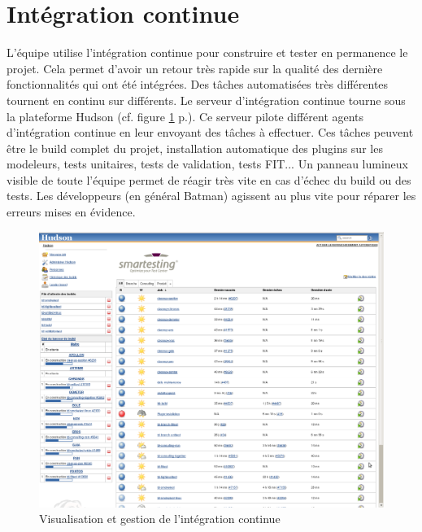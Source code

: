 \section{Intégration continue}
L'équipe utilise l'intégration continue pour construire et tester en permanence le projet. Cela permet d'avoir un retour très rapide sur la qualité des dernière fonctionnalités qui ont été intégrées. Des tâches automatisées très différentes tournent en continu sur différents. Le serveur d'intégration continue tourne sous la plateforme Hudson (cf. figure \ref{figure:hudson} p.\pageref{figure:hudson}). Ce serveur pilote différent agents d'intégration continue en leur envoyant des tâches à effectuer. Ces tâches peuvent être le build complet du projet, installation automatique des plugins sur les modeleurs, tests unitaires, tests de validation, tests FIT... Un panneau lumineux visible de toute l'équipe permet de réagir très vite en cas d'échec du build ou des tests. Les développeurs (en général Batman) agissent au plus vite pour réparer les erreurs mises en évidence.
\begin{figure}[!ht]
\centering
\includegraphics[width=\textwidth]{Illustrations/hudson.png}
\caption{Visualisation et gestion de l'intégration continue}
\label{figure:hudson}
\end{figure}
